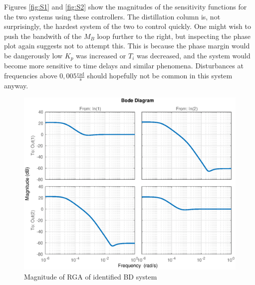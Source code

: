 \documentclass[12pt]{article}
\begin{document}
Figures \ref{fig:S1} and \ref{fig:S2} show the magnitudes of the sensitivity functions for the two systems using these controllers. The distillation column is, not surprisingly, the hardest system of the two to control quickly. One might wish to push the bandwith of the $M_B$ loop further to the right, but inspecting the phase plot again suggests not to attempt this. This is because the phase margin would be dangerously low $K_p$ was increased or $T_i$ was decreased, and the system would become more sensitive to time delays and similar phenomena. Disturbances at frequencies above $0,005 \frac{\textrm{rad}}{\textrm{s}}$ should hopefully not be common in this system anyway.


\begin{figure}[p]
\centering
\includegraphics[width=\textwidth]{../Systemanalyse/Log_Data_to_Matlab/Figurer/Identifisering/BD_RGA.eps}
\caption{Magnitude of RGA of identified BD system}
\label{fig:BD_RGA}
\end{figure}
\end{document}

